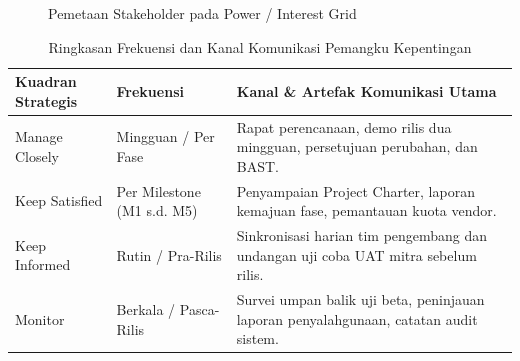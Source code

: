 \documentclass[11pt,a4paper]{article}
\newcommand{\thdr}[1]{\centering\arraybackslash\textbf{#1}}
\begin{document}
\begin{figure}[H]
\caption{Pemetaan Stakeholder pada Power / Interest Grid}
\end{figure}

\begin{table}[H]
\centering
\caption{Ringkasan Frekuensi dan Kanal Komunikasi Pemangku Kepentingan}
\small
\begin{tabularx}{\textwidth}{| L{3.6cm} | L{3.0cm} | Y |}
\hline
{} \thdr{Kuadran Strategis} & \thdr{Frekuensi} & \thdr{Kanal \& Artefak Komunikasi Utama} \\
\hline
Manage Closely & Mingguan / Per Fase & Rapat perencanaan, demo rilis dua mingguan, persetujuan perubahan, dan BAST. \\
\hline
Keep Satisfied & Per Milestone (M1 s.d. M5) & Penyampaian Project Charter, laporan kemajuan fase, pemantauan kuota vendor. \\
\hline
Keep Informed & Rutin / Pra-Rilis & Sinkronisasi harian tim pengembang dan undangan uji coba UAT mitra sebelum rilis. \\
\hline
Monitor & Berkala / Pasca-Rilis & Survei umpan balik uji beta, peninjauan laporan penyalahgunaan, catatan audit sistem. \\
\hline
\end{tabularx}
\end{table}

\clearpage
\end{document}
